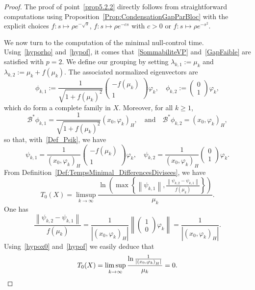 \documentclass[10pt]{amsart}
\theoremstyle{definition}\newtheorem{defi}[theo]{Definition}\newtheorem{rema}[theo]{Remark}\newtheorem{exam}[theo]{Example}\newtheorem{exem}[theo]{Example}\newtheorem{nota}[theo]{Notation}
\newcommand\Bs{\mathcal{B}^*}
\newcommand{\normeX}[1]{\left\| #1 \right\|}
\newcommand{\psH}[2]{\left(#1, #2 \right)_H}
\begin{document}
\begin{proof}
The proof of point~\eqref{prop5.2.2} directly follows from straightforward computations using Proposition~\ref{Prop:CondensationGapParBloc} with the explicit choices $f : s \mapsto \rho e^{-\sqrt{s}}$, $ f : s \mapsto \rho e^{-cs}$ with $c >0$ or $f : s \mapsto \rho e^{-s^2}$.

We now turn to the computation of the minimal null-control time. Using~\eqref{hyporho} and~\eqref{hypof}, it comes that~\eqref{SommabiliteVP} and~\eqref{GapFaible} are satisfied with $p=2$. We define our grouping by setting $\lambda_{k,1}:=\mu_k$ and $\lambda_{k,2}:=\mu_k+f(\mu_k)$. The associated normalized eigenvectors are
\[
\phi_{k,1} := \frac{1}{\sqrt{1+f(\mu_k)^2}}
\begin{pmatrix} -f(\mu_k) \\ 1
\end{pmatrix} \varphi_k,
\quad
\phi_{k,2} :=
\begin{pmatrix} 0 \\ 1
\end{pmatrix} \varphi_k,
\]
which do form a complete family in $X$. Moreover, for all $k \geq 1$,
\[
\Bs \phi_{k,1}= \frac{1}{\sqrt{1+f(\mu_k)^2}} \psH{x_0}{\varphi_k},
\quad \text{and} \quad
\Bs \phi_{k,2}= \psH{x_0}{\varphi_k},
\]
so that, with~\eqref{Def_Psik}, we have
\[
\psi_{k,1} = \frac{1}{\psH{x_0}{\varphi_k}}
\begin{pmatrix} -f(\mu_k) \\ 1
\end{pmatrix} \varphi_k,
\quad
\psi_{k,2} = \frac{1}{\psH{x_0}{\varphi_k}}
\begin{pmatrix} 0 \\ 1
\end{pmatrix} \varphi_k.
\]
From Definition~\eqref{Def:TempsMinimal_DifferencesDivisees}, we have
\[
T_0(X) = \limsup_{k \to \infty}\frac{\ln \left(\max \left\{ \normeX{\psi_{k,1}}, \frac{ \normeX{\psi_{k,2}-\psi_{k,1}} }{f(\mu_k)} \right\}\right) }{\mu_k}.
\]
One has
\begin{equation}\label{ExemplesCompensation}
\frac{ \normeX{\psi_{k,2}-\psi_{k,1}} }{f(\mu_k)} = \frac{1}{| \psH{x_0}{\varphi_k} |} \normeX{
\begin{pmatrix} 1 \\ 0
\end{pmatrix} \varphi_k} = \frac{1}{| \psH{x_0}{\varphi_k} |}.
\end{equation}
Using~\eqref{hypox0} and~\eqref{hypof} we easily deduce that
\[
T_0(X) = \limsup_{k \to \infty}\frac{\ln \frac{1}{| \psH{x_0}{\varphi_k} |}}{\mu_k} = 0.\qedhere
\]
\end{proof}
\end{document}
